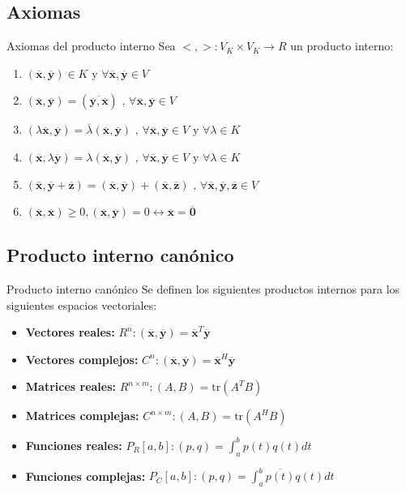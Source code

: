 \documentclass[a4paper, twoside]{article}
\numberwithin{equation}{section}
\numberwithin{figure}{section}
\numberwithin{table}{section}
\newcommand{\vect}[1]{\overline{\textbf{#1}}}
\newcommand{\tr}[1]{\text{tr}(#1)}
\newcommand{\produ}[1]{(#1)}
\begin{document}
\subsection{Axiomas}
\begin{definicion*}{Axiomas del producto interno}
	Sea $<,>:V_K \times V_K \to R$ un producto interno:
	\begin{enumerate}
		\item $\produ{\vect{x},\vect{y}} \in K \text{ y } \forall \vect{x},\vect{y} \in V$
		\item $\produ{\vect{x},\vect{y}}=\produ{\overline{\vect{y},\vect{x}}} \text{ , } \forall \vect{x},\vect{y} \in V$
		\item $\produ{\lambda \vect{x},\vect{y}}=\overline{\lambda}\produ{\vect{x},\vect{y}} \text{ , } \forall \vect{x},\vect{y} \in V \text{ y } \forall \lambda \in K$
		\item $\produ{\vect{x},\lambda \vect{y}}=\lambda \produ{\vect{x},\vect{y}} \text{ , } \forall \vect{x},\vect{y} \in V \text{ y } \forall \lambda \in K$
		\item $\produ{\vect{x},\vect{y}+\vect{z}}=\produ{\vect{x},\vect{y}}+\produ{\vect{x},\vect{z}} \text{ , } \forall \vect{x},\vect{y},\vect{z} \in V$
		\item $\produ{\vect{x},\vect{x}} \geq 0 ,\produ{\vect{x},\vect{y}}=0 \longleftrightarrow \vect{x}=\vect{0}$
	\end{enumerate}
\end{definicion*}

\subsection{Producto interno canónico}
\begin{definicion*}{Producto interno canónico}
	Se definen los siguientes productos internos para los siguientes espacios vectoriales:
	\begin{itemize}
		\item \textbf{Vectores reales:} $R^n:\produ{\vect{x},\vect{y}}=\vect{x}^T\vect{y}$
		\item \textbf{Vectores complejos:} $C^n:\produ{\vect{x},\vect{y}}=\vect{x}^H\vect{y}$
		\item \textbf{Matrices reales:} $R^{n \times m}:\produ{A,B}=\tr{A^T B}$
		\item \textbf{Matrices complejas:} $C^{n \times m}:\produ{A,B}=\tr{A^H B}$
		\item \textbf{Funciones reales:} $P_R[a,b]:\produ{p,q}=\int_a^b p(t)q(t)dt$
		\item \textbf{Funciones complejas:} $P_C[a,b]:\produ{p,q}=\int_a^b \overline{p(t)}q(t)dt$
	\end{itemize}
\end{definicion*}
\end{document}

